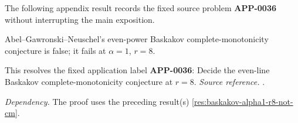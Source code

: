 The following appendix result records the fixed source problem \textbf{APP-0036} \cite{abel-gawronski-neuschel} without interrupting the main exposition.
\begin{counterexample}[APP-0036: Baskakov even-line complete-monotonicity fails at \(r=8\)]
\label{res:not-baskakov-higher-power-even-conjecture}
Abel--Gawronski--Neuschel's even-power Baskakov complete-monotonicity conjecture is false; it fails at \(\alpha=1\), \(r=8\).

This resolves the fixed application label \textbf{APP-0036}: Decide the even-line Baskakov complete-monotonicity conjecture at \(r=8\).
\emph{Source reference.} \cite{abel-gawronski-neuschel}.

\emph{Dependency.} The proof uses the preceding result(s) \ref{res:baskakov-alpha1-r8-not-cm}.
\end{counterexample}
